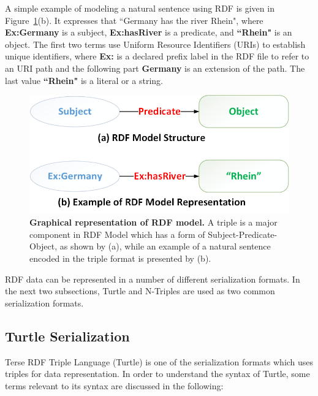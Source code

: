 A simple example of modeling a natural sentence using RDF is given in Figure~\ref{Fig:rdfModel}(b). 
It expresses that ``Germany has the river Rhein", where \textbf{Ex:Germany} is a subject, \textbf{Ex:hasRiver} is a predicate, and \textbf{``Rhein"} is an object. 
The first two terms use Uniform Resource Identifiers (URIs) to establish unique identifiers, where \textbf{Ex:} is a declared prefix label in the RDF file to refer to an URI path and the following part \textbf{Germany} is an extension of the path. 
The last value \textbf{``Rhein"} is a literal or a string. %

\begin{figure}[ht]
	\begin{center}
		\includegraphics[scale=0.4,angle=0]{images/RDF-Model}
		\setlength\belowcaptionskip{-5mm}
		\caption{\textbf{Graphical representation of RDF model.} A triple is a major component in RDF Model which has a form of Subject-Predicate-Object, as shown by (a), while an example of a natural sentence encoded in the triple format is presented by (b).}
		\label{Fig:rdfModel}
	\end{center}
\end{figure}
RDF data can be represented in a number of different serialization formats.
In the next two subsections, Turtle and N-Triples are used as two common serialization formats. 

\subsection{Turtle Serialization}
Terse RDF Triple Language (Turtle) \cite{W3C:Turtle:Online} is one of the serialization formats which uses triples for data representation. 
In order to understand the syntax of Turtle, some terms  relevant to its syntax are discussed in the following:

